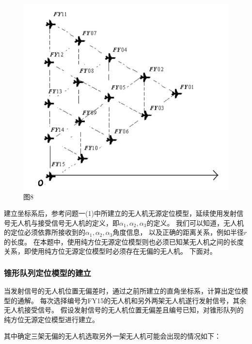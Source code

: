\documentclass{ctexart}
\def\al{\alpha}
\begin{document}
	\begin{figure}[htbp]
		\centering
		\includegraphics[scale=0.2]{pic/8.2.jpg}
		\caption*{图8}
	\end{figure}
		
	\par 建立坐标系后，参考问题一(1)中所建立的无人机无源定位模型，延续使用发射信号无人机与接受信号无人机的定义，即$\al_1,\al_2,\al_3$的定义。
	我们可以知道，无人机的定位必须依靠所接收到的$\al_1,\al_2,\al_3$角度信息，
	以及正确的距离关系，例如半径$r$的长度。
	在本题中，使用纯方位无源定位模型则也必须已知某无人机之间的长度关系，即使用纯方位无源定位模型时必须存在无偏的无人机。
	下面对。
	

	\subsubsection{锥形队列定位模型的建立}
	当发射信号的无人机位置无偏差时，通过之前所建立的直角坐标系，计算出定位模型的通解。
	每次选择编号为FY15的无人机和另外两架无人机遂行发射信号，其余无人机接受信号。
	假设发射信号的无人机位置无偏差且编号已知，对锥形队列的纯方位无源定位模型进行建立。

	\par 其中确定三架无偏的无人机选取另外一架无人机可能会出现的情况如下：
\end{document}
